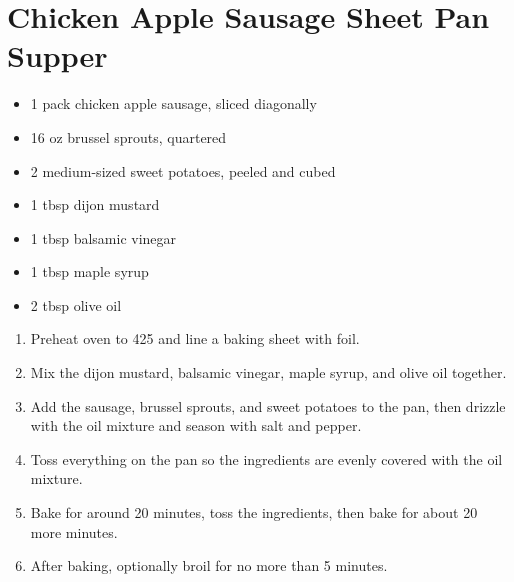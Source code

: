 \section{Chicken Apple Sausage Sheet Pan Supper}

\begin{itemize}
\item 1 pack chicken apple sausage, sliced diagonally
\item 16 oz brussel sprouts, quartered
\item 2 medium-sized sweet potatoes, peeled and cubed
\item 1 tbsp dijon mustard
\item 1 tbsp balsamic vinegar
\item 1 tbsp maple syrup
\item 2 tbsp olive oil
\end{itemize}

\begin{enumerate}
\item Preheat oven to 425 and line a baking sheet with foil.
\item Mix the dijon mustard, balsamic vinegar, maple syrup, and olive oil together.
\item Add the sausage, brussel sprouts, and sweet potatoes to the pan, then drizzle with the oil mixture and season
    with salt and pepper.
\item Toss everything on the pan so the ingredients are evenly covered with the oil mixture.
\item Bake for around 20 minutes, toss the ingredients, then bake for about 20 more minutes.
\item After baking, optionally broil for no more than 5 minutes.
\end{enumerate}
